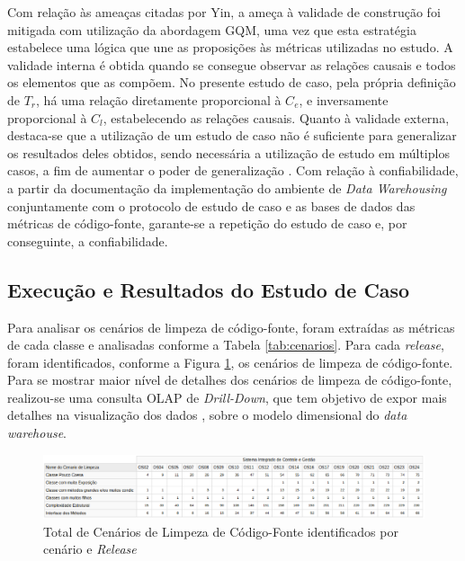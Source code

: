 Com relação às ameaças citadas por Yin, a ameça à validade de construção foi mitigada com utilização da abordagem GQM, uma vez que esta estratégia estabelece uma lógica que une as proposições às métricas utilizadas no estudo. A validade interna é obtida quando se consegue observar as relações causais e todos os elementos que as compõem. No presente estudo de caso, pela própria definição de $T_r$, há uma relação diretamente proporcional à $C_e$, e inversamente proporcional à $C_l$, estabelecendo as relações causais. Quanto à validade externa, destaca-se que a utilização de um estudo de caso não é suficiente para generalizar os resultados deles obtidos, sendo necessária a utilização de estudo em múltiplos casos, a fim de aumentar o poder de generalização \cite{yin2011applications}. Com relação à confiabilidade, a partir da documentação da implementação do ambiente de \textit{Data Warehousing} conjuntamente com o protocolo de estudo de caso e as bases de dados das métricas de código-fonte, garante-se a repetição do estudo de caso e, por conseguinte, a confiabilidade.

\subsection{Execução e Resultados do Estudo de Caso}
\label{sec:resultados}
Para analisar os cenários de limpeza de código-fonte, foram extraídas as métricas de cada classe e analisadas conforme a Tabela \ref{tab:cenarios}. Para cada \textit{release}, foram identificados, conforme a Figura \ref{fig:cenarios-release}, os cenários de limpeza de código-fonte. Para se mostrar maior nível de detalhes dos cenários de limpeza de código-fonte, realizou-se uma consulta OLAP de \textit{Drill-Down}, que tem objetivo de expor mais detalhes na visualização dos dados \cite{Kimball2002}, sobre o modelo dimensional do \textit{data warehouse}. 


\begin{figure}[ht!]
\centering
\includegraphics[keepaspectratio=true,scale=0.43]{figuras/total-cenario-tipo.eps}
\caption{Total de Cenários de Limpeza de Código-Fonte identificados por cenário e \textit{Release}}
\label{fig:cenarios-release}
\end{figure}
\FloatBarrier

